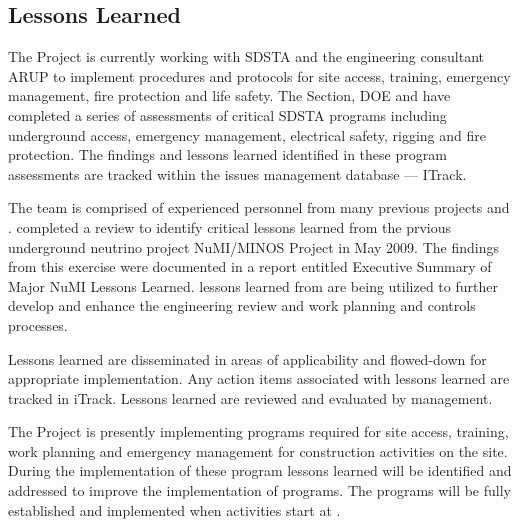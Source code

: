 \subsection{Lessons Learned}

The  Project is currently working with SDSTA and the 
engineering consultant ARUP to implement  procedures and
protocols for site access, training, emergency management, fire
protection and life safety. The \fnal {} Section, DOE and
  have completed a series of assessments of
critical SDSTA  programs including underground access,
emergency management, electrical safety, rigging and fire
protection. The findings and lessons learned identified in these
 program assessments are tracked within the \fnal issues management
database --- ITrack.

The  team is comprised of experienced personnel from many
previous projects and .  \fnal completed a review to
identify critical lessons learned from the prvious underground
neutrino project NuMI/MINOS Project in May 2009. The findings from this
exercise were documented in a report entitled Executive Summary of
Major NuMI Lessons Learned.   lessons learned from
 are being utilized to further develop and enhance
the  engineering review and work planning and controls
processes.

Lessons learned are disseminated in areas of applicability and
flowed-down for appropriate implementation. Any action items
associated with lessons learned are tracked in iTrack. Lessons learned
are reviewed and evaluated by \fnal management.

The  Project is presently implementing 
programs required for site access, training, work planning and
emergency management for construction activities on the 
site. During the implementation of these program lessons learned will
be identified and addressed to improve the implementation of
 programs.  The  programs will be fully
established and implemented when  activities start at
.
